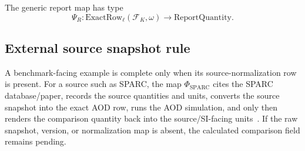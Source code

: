 The generic report map has type
\[
\Psi_R:
\mathrm{ExactRow}_{\ell}(\mathcal F_K,\omega)
\longrightarrow
\mathrm{ReportQuantity}.
\]

\subsection{External source snapshot rule}
\label{app:manual-source-snapshot-rule}

A benchmark-facing example is complete only when its source-normalization row is present. For a source such as SPARC, the map \(\Phi_{\mathrm{SPARC}}\) cites the SPARC database/paper, records the source quantities and units, converts the source snapshot into the exact AOD row, runs the AOD simulation, and only then renders the comparison quantity back into the source/SI-facing units~\cite{sparc_paper,sparc_site}. If the raw snapshot, version, or normalization map is absent, the calculated comparison field remains pending.
